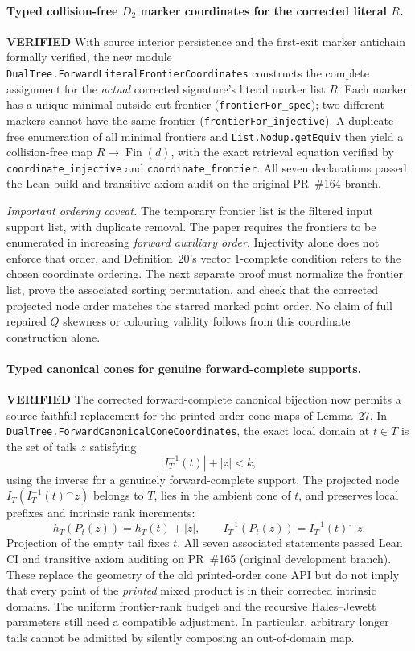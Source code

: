 \documentclass[11pt]{article}
\newcommand{\ok}{\textcolor{green!40!black}{\textbf{VERIFIED}}}
\newcommand{\lean}[1]{\texttt{#1}}
\begin{document}
\paragraph{Typed collision-free $D_2$ marker coordinates for the corrected literal $R$.} \ok
With source interior persistence and the first-exit
marker antichain formally verified, the new module
\lean{DualTree.ForwardLiteralFrontierCoordinates}
constructs the complete assignment for the
\emph{actual} corrected signature's literal marker
list $R$. Each marker has a unique minimal
outside-cut frontier
(\lean{frontierFor_spec}); two different markers
cannot have the same frontier
(\lean{frontierFor_injective}).
A duplicate-free enumeration of all minimal
frontiers and \texttt{List.Nodup.getEquiv}
then yield a collision-free map
$R\to\operatorname{Fin}(d)$, with the exact
retrieval equation verified by
\lean{coordinate_injective} and
\lean{coordinate_frontier}.
All seven declarations passed the Lean build and transitive axiom audit on the original PR~\#164 branch.

\emph{Important ordering caveat.} The temporary
frontier list is the filtered input support
list, with duplicate removal. The paper
requires the frontiers to be enumerated in
increasing \emph{forward auxiliary order}.
Injectivity alone does not enforce that
order, and Definition~20's vector
$1$-complete condition refers to the chosen
coordinate ordering. The next separate
proof must normalize the frontier list,
prove the associated sorting permutation,
and check that the corrected projected
node order matches the starred marked
point order. No claim of full repaired
$Q$ skewness or colouring validity follows
from this coordinate construction alone.

\paragraph{Typed canonical cones for genuine forward-complete supports.} \ok
The corrected forward-complete canonical bijection
now permits a source-faithful replacement for the
printed-order cone maps of Lemma~27.
In \lean{DualTree.ForwardCanonicalConeCoordinates},
the exact local domain at $t\in T$ is the set
of tails $z$ satisfying
\[
 |I_T^{-1}(t)|+|z|<k,
\]
using the inverse for a genuinely forward-complete
support. The projected node
$I_T(I_T^{-1}(t)^\frown z)$ belongs to $T$,
lies in the ambient cone of $t$, and preserves
local prefixes and intrinsic rank increments:
\[
 h_T(P_t(z))=h_T(t)+|z|,\qquad
 I_T^{-1}(P_t(z))=I_T^{-1}(t)^\frown z.
\]
Projection of the empty tail fixes $t$.
All seven associated statements passed Lean CI and transitive
axiom auditing on PR~\#165 (original development branch).
These replace the geometry of the old
printed-order cone API but do not imply that
every point of the \emph{printed} mixed product
is in their corrected intrinsic domains.
The uniform frontier-rank budget and the
recursive Hales--Jewett parameters still need
a compatible adjustment. In particular,
arbitrary longer tails cannot be admitted
by silently composing an out-of-domain map.
\end{document}
